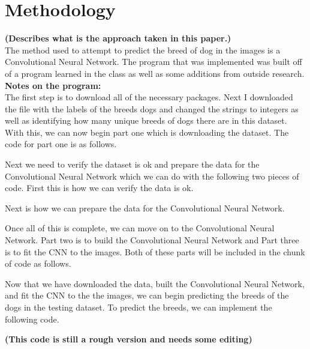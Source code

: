 \documentclass[12pt]{article}
\begin{document}
\section{Methodology}
\textbf{(Describes what is the approach taken in this paper.)}\\
\indent The method used to attempt to predict the breed of dog in the images is a Convolutional Neural Network.  The program that was implemented was built off of a program learned in the class as well as some additions from outside research.\\
\textbf{Notes on the program:}\\
\indent The first step is to download all of the necessary packages.  Next I downloaded the file with the labels of the breeds dogs and changed the strings to integers as well as identifying how many unique breeds of dogs there are in this dataset.  With this, we can now begin part one which is downloading the dataset.  The code for part one is as follows.

Next we need to verify the dataset is ok and prepare the data for the Convolutional Neural Network which we can do with the following two pieces of code.  First this is how we can verify the data is ok.

Next is how we can prepare the data for the Convolutional Neural Network.

Once all of this is complete, we can move on to the Convolutional Neural Network.  Part two is to build the Convolutional Neural Network and Part three is to fit the CNN to the images.  Both of these parts will be included in the chunk of code as follows.

Now that we have downloaded the data, built the Convolutional Neural Network, and fit the CNN to the the images, we can begin predicting the breeds of the dogs in the testing dataset.  To predict the breeds, we can implement the following code.

\textbf{(This code is still a rough version and needs some editing)}
\end{document}
